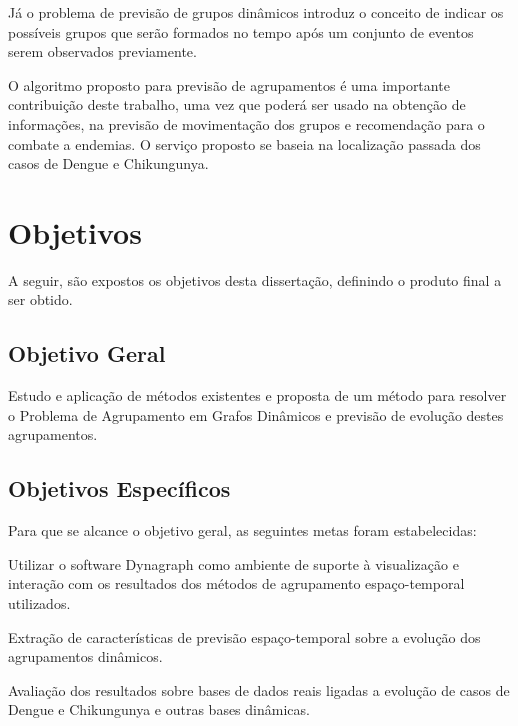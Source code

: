 Já o problema de previsão de grupos dinâmicos introduz o conceito de indicar os
possíveis grupos que serão formados no tempo após um conjunto de eventos serem
observados previamente.

O algoritmo proposto para previsão de agrupamentos é uma importante contribuição
deste trabalho, uma vez que poderá ser usado na obtenção de informações, na previsão de movimentação dos grupos e recomendação para o combate a endemias. O serviço proposto se baseia na localização passada dos casos de Dengue e Chikungunya.



\section{Objetivos}
\label{sec:objetivos}
A seguir, são expostos os objetivos desta dissertação, definindo o produto
final a ser obtido.

\subsection{Objetivo Geral}

Estudo e aplicação de métodos existentes e proposta de um método para resolver o Problema de Agrupamento
em Grafos Dinâmicos e previsão de evolução destes agrupamentos.

\subsection{Objetivos Específicos}
\label{sec:objetivos-especificos}

Para que se alcance o objetivo geral, as seguintes metas foram estabelecidas:

\begin{alineas}
	\item Utilizar o software Dynagraph como ambiente de suporte à visualização e interação com os resultados dos métodos de agrupamento espaço-temporal utilizados.
	\item Extração de características de previsão espaço-temporal sobre a evolução dos agrupamentos dinâmicos.
	\item Avaliação dos resultados sobre bases de dados reais ligadas a evolução de casos de Dengue e Chikungunya e outras bases dinâmicas.
\end{alineas}


